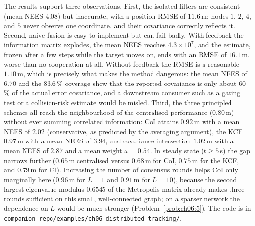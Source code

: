 \documentclass[graybox,envcountchap]{style/SNmono}
\newcommand{\repopath}[1]{\texttt{#1}}
\begin{document}
\begin{example}
The results support three observations. First, the isolated filters are consistent (mean NEES $4.08$) but inaccurate, with a position RMSE of $11.6$\,m: nodes $1$, $2$, $4$, and $5$ never observe one coordinate, and their covariance correctly reflects it. Second, naive fusion is easy to implement but can fail badly. With feedback the information matrix explodes, the mean NEES reaches $4.3\times10^{7}$, and the estimate, frozen after a few steps while the target moves on, ends with an RMSE of $16.1$\,m, worse than no cooperation at all. Without feedback the RMSE is a reasonable $1.10$\,m, which is precisely what makes the method dangerous: the mean NEES of $6.70$ and the $83.6\,\%$ coverage show that the reported covariance is only about 60\,\% of the actual error covariance, and a downstream consumer such as a gating test or a collision-risk estimate would be misled. Third, the three principled schemes all reach the neighbourhood of the centralised performance ($0.80$\,m) without ever summing correlated information: CoI attains $0.92$\,m with a mean NEES of $2.02$ (conservative, as predicted by the averaging argument), the KCF $0.97$\,m with a mean NEES of $3.94$, and covariance intersection $1.02$\,m with a mean NEES of $2.87$ and a mean weight $\omega=0.54$. In steady state ($t\ge5$\,s) the gap narrows further ($0.65$\,m centralised versus $0.68$\,m for CoI, $0.75$\,m for the KCF, and $0.79$\,m for CI). Increasing the number of consensus rounds helps CoI only marginally here ($0.96$\,m for $L=1$ and $0.91$\,m for $L=10$), because the second largest eigenvalue modulus $0.6545$ of the Metropolis matrix already makes three rounds sufficient on this small, well-connected graph; on a sparser network the dependence on $L$ would be much stronger (Problem~\ref{prob:ch06:5}). The code is in \repopath{companion\_\allowbreak repo/\allowbreak examples/\allowbreak ch06\_\allowbreak distributed\_\allowbreak tracking/\allowbreak }.
\end{example}
\end{document}
